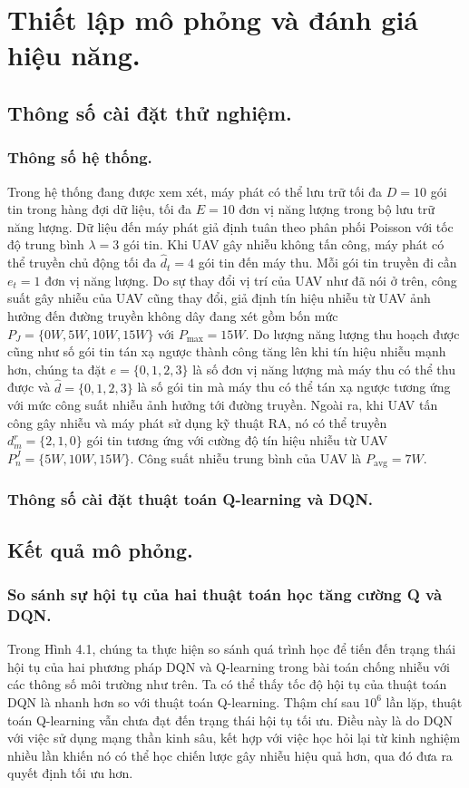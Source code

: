\documentclass{uetgraduation}
\begin{document}
\chapter{Thiết lập mô phỏng và đánh giá hiệu năng.}
\section{Thông số cài đặt thử nghiệm.}
\subsection{Thông số hệ thống.}
Trong hệ thống đang được xem xét, máy phát có thể lưu trữ tối đa $D = 10$ gói tin trong hàng đợi dữ liệu, tối đa $E = 10$ đơn vị năng lượng
trong bộ lưu trữ năng lượng. Dữ liệu đến máy phát giả định tuân theo phân phối Poisson với tốc độ trung bình $\lambda = 3$ 
gói tin. Khi UAV gây nhiễu không tấn công, máy phát có thể truyền chủ động tối đa $\hat{d}_t = 4$ gói tin đến máy thu. Mỗi gói tin truyền đi cần
$e_t = 1$ đơn vị năng lượng. Do sự thay đổi vị trí của UAV như đã nói ở trên, công suất gây nhiễu của UAV cũng thay đổi, giả định tín hiệu nhiễu từ 
UAV ảnh hưởng đến đường truyền không dây đang xét gồm bốn mức $P_J = \{0W, 5W, 10W, 15W\}$ với $P_{\text{max}} = 15W$. Do lượng năng lượng
thu hoạch được cũng như số gói tin tán xạ ngược thành công tăng lên khi tín hiệu nhiễu mạnh hơn, chúng ta đặt $e = \{0, 1, 2, 3\}$ là số đơn vị
năng lượng mà máy thu có thể thu được và $\hat{d} = \{0, 1, 2, 3\}$ là số gói tin mà máy thu có thể tán xạ ngược tương ứng với mức công suất nhiễu
ảnh hưởng tới đường truyền. Ngoài ra, khi UAV tấn công gây nhiễu và máy phát sử dụng kỹ thuật RA, nó có thể truyền $d^r_m = \{2, 1, 0\}$ gói tin
tương ứng với cường độ tín hiệu nhiễu từ UAV $P^J_n = \{5W, 10W, 15W\}$. Công suất nhiễu trung bình của UAV là $P_\text{avg} = 7W$.

\subsection{Thông số cài đặt thuật toán Q-learning và DQN.}


\section{Kết quả mô phỏng.}
\subsection{So sánh sự hội tụ của hai thuật toán học tăng cường Q và DQN.}
Trong Hình 4.1, chúng ta thực hiện so sánh quá trình học để tiến đến trạng thái hội tụ của hai phương pháp DQN và Q-learning trong bài toán
chống nhiễu với các thông số môi trường như trên. Ta có thể thấy tốc độ hội tụ của thuật toán DQN là nhanh hơn so với thuật toán Q-learning.
Thậm chí sau $10^6$ lần lặp, thuật toán Q-learning vẫn chưa đạt đến trạng thái hội tụ tối ưu. Điều này là do DQN với việc sử dụng mạng thần
kinh sâu, kết hợp với việc học hỏi lại từ kinh nghiệm nhiều lần khiến nó có thể học chiến lược gây nhiễu hiệu quả hơn, qua đó đưa ra quyết định
tối ưu hơn.
\end{document}
